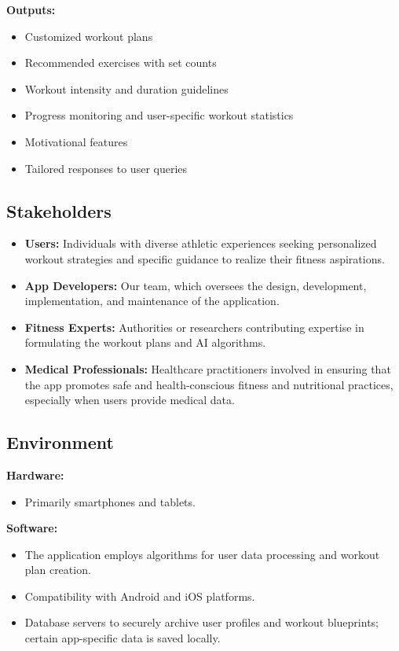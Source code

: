 \documentclass{article}
\begin{document}
    \noindent\textbf{Outputs:}
    \begin{itemize}
        \item Customized workout plans
        \item Recommended exercises with set counts
        \item Workout intensity and duration guidelines
        \item Progress monitoring and user-specific workout statistics
        \item Motivational features
        \item Tailored responses to user queries
    \end{itemize}

    \subsection{Stakeholders}

    \begin{itemize}
        \item \textbf{Users:} Individuals with diverse athletic experiences seeking personalized workout strategies and specific guidance to realize their fitness aspirations.
        \item \textbf{App Developers:} Our team, which oversees the design, development, implementation, and maintenance of the application.
        \item \textbf{Fitness Experts:} Authorities or researchers contributing expertise in formulating the workout plans and AI algorithms.
        \item \textbf{Medical Professionals:} Healthcare practitioners involved in ensuring that the app promotes safe and health-conscious fitness and nutritional practices, especially when users provide medical data.
    \end{itemize}

    \subsection{Environment}

    \textbf{Hardware:}
    \begin{itemize}
        \item Primarily smartphones and tablets.
    \end{itemize}

    \noindent \textbf{Software:}
    \begin{itemize}
        \item The application employs algorithms for user data processing and workout plan creation.
        \item Compatibility with Android and iOS platforms.
        \item Database servers to securely archive user profiles and workout blueprints; certain app-specific data is saved locally.
    \end{itemize}
\end{document}

